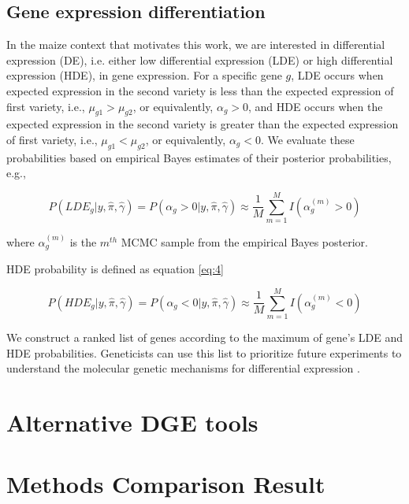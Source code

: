 \documentclass[11pt]{isuthesis}
\begin{document}
\subsection{Gene expression differentiation}

In the maize context that motivates this work, we are interested in differential expression (DE), i.e. either low differential expression (LDE) or high differential expression (HDE), in gene expression. For a specific gene $g$, LDE occurs when expected expression in the second variety is less than the expected expression of first variety, i.e., $\mu_{g1} > \mu_{g2}$, or equivalently, $\alpha_g>0$, and HDE occurs when the expected expression in the second variety is greater than the expected expression of first variety, i.e., $\mu_{g1} < \mu_{g2}$, or equivalently, $\alpha_g<0$. We evaluate these probabilities based on empirical Bayes estimates of their posterior probabilities, e.g., 

\begin{equation}
\label{eq:3}
P(LDE_g | y, \hat{\pi}, \hat{\gamma}) = P(\alpha_g>0 | y, \hat{\pi}, \hat{\gamma}) \approx \frac{1}{M} \sum_{m=1}^M I(\alpha_g ^ {(m)}>0)
\end{equation}

where $\alpha_g^{(m)}$ is the $m^{th}$ MCMC sample from the empirical Bayes posterior.

HDE probability is defined as equation \ref{eq:4}

\begin{equation}
\label{eq:4}
P(HDE_g | y, \hat{\pi}, \hat{\gamma}) = P(\alpha_g<0 | y, \hat{\pi}, \hat{\gamma}) \approx \frac{1}{M} \sum_{m=1}^M I(\alpha_g ^ {(m)}<0)
\end{equation}

We construct a ranked list of genes according to the maximum of gene's LDE and HDE probabilities. Geneticists can use this list to prioritize future experiments to understand the molecular genetic mechanisms for differential expression \citep{niemi2015empirical}. 

\section{Alternative DGE tools}



\section{Methods Comparison Result}
\end{document}
